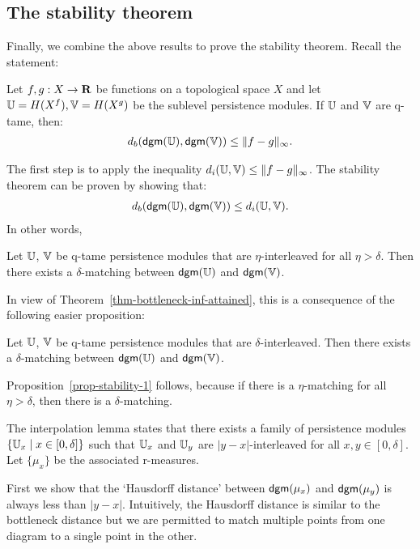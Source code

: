 \subsection{The stability theorem}

Finally, we combine the above results to prove the stability theorem. Recall the statement:

\begin{theorem}[Stability]
Let $f, g : X \to \mathbf{R}$ be functions on a topological space $X$ and let $\mathbb{U} = H(X^f), \mathbb{V} = H(X^g)$ be the sublevel persistence modules. If $\mathbb{U}$ and $\mathbb{V}$ are q-tame, then:
\begin{align*}
d_b(\mathsf{dgm}(\mathbb{U}), \mathsf{dgm}(\mathbb{V})) \leq \Vert f - g \Vert_\infty.
\end{align*}
\end{theorem}

The first step is to apply the inequality $d_i(\mathbb{U}, \mathbb{V}) \leq \Vert f - g \Vert_\infty$. The stability theorem can be proven by showing that:
\begin{align*}
d_b(\mathsf{dgm}(\mathbb{U}), \mathsf{dgm}(\mathbb{V})) \leq d_i(\mathbb{U}, \mathbb{V}).
\end{align*}
In other words,

\begin{proposition}
\label{prop-stability-1}
Let $\mathbb{U}$, $\mathbb{V}$ be q-tame persistence modules that are $\eta$-interleaved for all $\eta > \delta$. Then there exists a $\delta$-matching between $\mathsf{dgm}(\mathbb{U})$ and $\mathsf{dgm}(\mathbb{V})$.
\end{proposition}

In view of Theorem~\ref{thm-bottleneck-inf-attained}, this is a consequence of the following easier proposition:

\begin{proposition}
Let $\mathbb{U}$, $\mathbb{V}$ be q-tame persistence modules that are $\delta$-interleaved. Then there exists a $\delta$-matching between $\mathsf{dgm}(\mathbb{U})$ and $\mathsf{dgm}(\mathbb{V})$.
\end{proposition}

Proposition~\ref{prop-stability-1} follows, because if there is a $\eta$-matching for all $\eta > \delta$, then there is a $\delta$-matching.

The interpolation lemma states that there exists a family of persistence modules $\{\mathbb{U}_x \mid x \in [0, \delta]\}$ such that $\mathbb{U}_x$ and $\mathbb{U}_y$ are $|y-x|$-interleaved for all $x, y \in [0, \delta]$. Let $\{\mu_x\}$ be the associated r-measures.

First we show that the `Hausdorff distance' between $\mathsf{dgm}(\mu_x)$ and $\mathsf{dgm}(\mu_y)$ is always less than $|y-x|$. Intuitively, the Hausdorff distance is similar to the bottleneck distance but we are permitted to match multiple points from one diagram to a single point in the other. 

